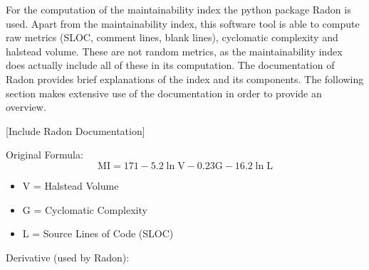 
For the computation of the maintainability index the python package Radon is used. Apart from the maintainability index, this software tool is able to compute raw metrics (SLOC, comment lines, blank lines), cyclomatic complexity and halstead volume. These are not random metrics, as the maintainability index does actually include all of these in its computation. The documentation of Radon provides brief explanations of the index and its components. The following section makes extensive use of the documentation in order to provide an overview.

[Include Radon Documentation]


Original Formula:
\begin{equation}
\mathrm{MI}=171-5.2 \ln \mathrm{V}-0.23 \mathrm{G}-16.2 \ln \mathrm{L}
\end{equation}

\begin{itemize}
\item V = Halstead Volume
\item G = Cyclomatic Complexity
\item L = Source Lines of Code (SLOC)
\end{itemize}

Derivative (used by Radon):

